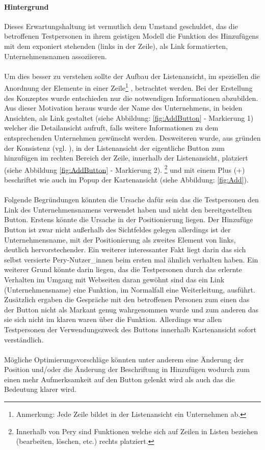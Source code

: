 \documentclass[Bachelorarbeit.tex]{subfiles}
\begin{document}
\paragraph{Hintergrund}
Dieses Erwartungshaltung ist vermutlich dem Umstand geschuldet, das die betroffenen Testpersonen in ihrem geistigen Modell die Funktion des Hinzufügens mit dem exponiert stehenden (links in der Zeile), als Link formatierten, Unternehmensnamen assoziieren. \\
\\
Um dies besser zu verstehen sollte der Aufbau der Listenansicht, im speziellen die Anordnung der Elemente in einer Zeile\footnote
{
	Anmerkung: Jede Zeile bildet in der Listenansicht ein Unternehmen ab.
	}
, betrachtet werden.
Bei der Erstellung des Konzeptes wurde entschieden nur die notwendigen Informationen abzubilden. Aus dieser Motivation heraus wurde der Name des Unternehmens, in beiden Ansichten, als Link gestaltet (siehe Abbildung: \ref{fig:AddButton} - Markierung 1) welcher die Detailansicht aufruft, falls weitere Informationen zu dem entsprechenden Unternehmen gewünscht werden.
Desweiteren wurde, aus gründen der Konsistenz (vgl. \cite[S. 103, 11:4 Ensure Visual Consistency]{Koyani2004}), in der Listenansicht der eigentliche Button zum hinzufügen im rechten Bereich der Zeile, innerhalb der Listenansicht, platziert (siehe Abbildung \ref{fig:AddButton} - Markierung 2). 
\footnote{
	Innerhalb von Pery sind Funktionen welche sich auf Zeilen in Listen beziehen (bearbeiten, löschen, etc.) rechts platziert.
	} 
und mit einem Plus (+) beschriftet wie auch im Popup der Kartenansicht (siehe Abbildung: \ref{fig:Add}).\\
\\
Folgende Begründungen könnten die Ursache dafür sein das die Testpersonen den Link des Unternehmensnamens verwendet haben und nicht den bereitgestellten Button.
Erstens könnte die Ursache in der Positionierung liegen. 
Der Hinzufüge Button ist zwar nicht außerhalb des Sichtfeldes gelegen allerdings ist der Unternehmensname, mit der Positionierung als zweites Element von links, deutlich hervorstechender.
Ein weiterer interessanter Fakt liegt darin das sich selbst versierte Pery-Nutzer\_innen beim ersten mal ähnlich verhalten haben. 
Ein weiterer Grund könnte darin liegen, das die Testpersonen durch das erlernte Verhalten im Umgang mit Webseiten daran gewöhnt sind das ein Link (Unternehmensname) eine Funktion, im Normalfall eine Weiterleitung, ausführt.
Zusätzlich ergaben die Gespräche mit den betroffenen Personen zum einen das der Button nicht als Markant genug wahrgenommen wurde und zum anderen das sie sich nicht im klaren waren über die Funktion. 
Allerdings war allen Testpersonen der Verwendungszweck des Buttons innerhalb Kartenansicht sofort verständlich.\\
\\
Mögliche Optimierungsvorschläge könnten unter anderem eine Änderung der Position und/oder die Änderung der Beschriftung in Hinzufügen wodurch zum einen mehr Aufmerksamkeit auf den Button gelenkt wird als auch das die Bedeutung klarer wird.
\end{document}
